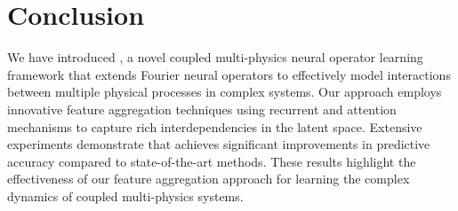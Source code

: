 
\section{Conclusion}
We have introduced \ours, a novel coupled multi-physics neural operator learning framework that extends Fourier neural operators to effectively model interactions between multiple physical processes in complex systems. Our approach employs innovative feature aggregation techniques using recurrent and attention mechanisms to capture rich interdependencies in the latent space. Extensive experiments demonstrate that \ours achieves significant improvements in predictive accuracy compared to state-of-the-art methods. These results highlight the effectiveness of our feature aggregation approach for learning the complex dynamics of coupled multi-physics systems. 
